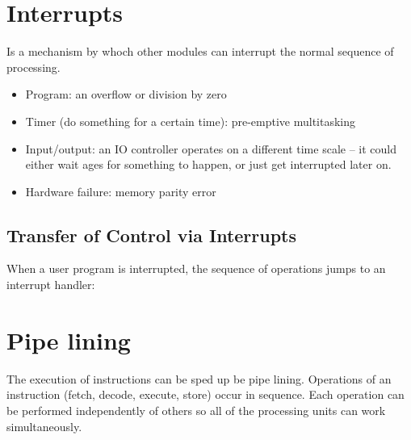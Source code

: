 \section{Interrupts}\label{sec:interrupts}

Is a mechanism by whoch other modules can interrupt the normal sequence of processing.

\begin{itemize}
	\item Program: an overflow or division by zero
	\item Timer (do something for a certain time): pre-emptive multitasking
	\item Input/output: an IO controller operates on a different time scale -- it could either wait ages for something to happen, or just get interrupted later on.
	\item Hardware failure: memory parity error
\end{itemize}

\subsection{Transfer of Control via Interrupts}\label{sub:transfer_of_control_via_interrupts}

When a user program is interrupted, the sequence of operations jumps to an interrupt handler:

\begin{center}
\end{center}

\section{Pipe lining}\label{sec:pipe_lining}

The execution of instructions can be sped up be pipe lining.
Operations of an instruction (fetch, decode, execute, store) occur in sequence.
Each operation can be performed independently of others so all of the processing units can work simultaneously.

